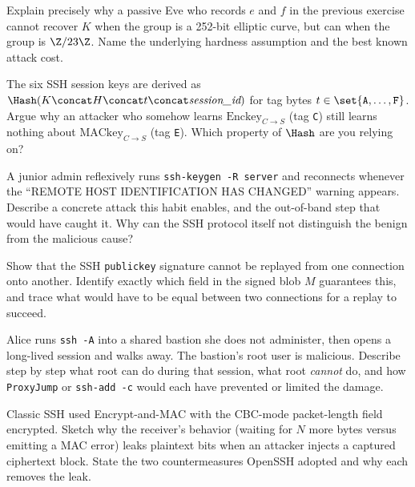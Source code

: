 \begin{exercise}
Explain precisely why a passive Eve who records $e$ and $f$ in the previous exercise cannot recover $K$ when the group is a 252-bit elliptic curve, but can when the group is $\Z/23\Z$. Name the underlying hardness assumption and the best known attack cost.
\end{exercise}

\begin{exercise}
The six SSH session keys are derived as $\Hash(K \concat H \concat t \concat \textit{session\_id})$ for tag bytes $t \in \set{\texttt{A},\dots,\texttt{F}}$. Argue why an attacker who somehow learns $\text{Enckey}_{C\to S}$ (tag \texttt{C}) still learns nothing about $\text{MACkey}_{C\to S}$ (tag \texttt{E}). Which property of $\Hash$ are you relying on?
\end{exercise}

\begin{exercise}
A junior admin reflexively runs \texttt{ssh-keygen -R server} and reconnects whenever the ``REMOTE HOST IDENTIFICATION HAS CHANGED'' warning appears. Describe a concrete attack this habit enables, and the out-of-band step that would have caught it. Why can the SSH protocol itself not distinguish the benign from the malicious cause?
\end{exercise}

\begin{exercise}
Show that the SSH \texttt{publickey} signature cannot be replayed from one connection onto another. Identify exactly which field in the signed blob $M$ guarantees this, and trace what would have to be equal between two connections for a replay to succeed.
\end{exercise}

\begin{exercise}
Alice runs \texttt{ssh -A} into a shared bastion she does not administer, then opens a long-lived session and walks away. The bastion's root user is malicious. Describe step by step what root can do during that session, what root \emph{cannot} do, and how \texttt{ProxyJump} or \texttt{ssh-add -c} would each have prevented or limited the damage.
\end{exercise}

\begin{exercise}
Classic SSH used Encrypt-and-MAC with the CBC-mode packet-length field encrypted. Sketch why the receiver's behavior (waiting for $N$ more bytes versus emitting a MAC error) leaks plaintext bits when an attacker injects a captured ciphertext block. State the two countermeasures OpenSSH adopted and why each removes the leak.
\end{exercise}

